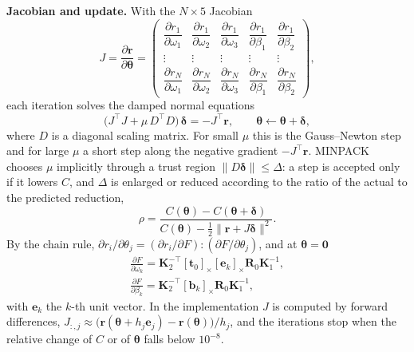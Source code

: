 \documentclass[10pt,a4paper,twocolumn]{article}
\newcommand{\R}{\mathbf{R}}
\newcommand{\tv}{\mathbf{t}}
\newcommand{\K}{\mathbf{K}}
\begin{document}
\textbf{Jacobian and update.} With the $N\times5$ Jacobian
\begin{equation}
  J=\frac{\partial\mathbf{r}}{\partial\boldsymbol\theta}=
  \begin{pmatrix}
    \dfrac{\partial r_1}{\partial\omega_1}&\dfrac{\partial r_1}{\partial\omega_2}&\dfrac{\partial r_1}{\partial\omega_3}&\dfrac{\partial r_1}{\partial\beta_1}&\dfrac{\partial r_1}{\partial\beta_2}\\[2pt]
    \vdots&\vdots&\vdots&\vdots&\vdots\\
    \dfrac{\partial r_N}{\partial\omega_1}&\dfrac{\partial r_N}{\partial\omega_2}&\dfrac{\partial r_N}{\partial\omega_3}&\dfrac{\partial r_N}{\partial\beta_1}&\dfrac{\partial r_N}{\partial\beta_2}
  \end{pmatrix},
\end{equation}
each iteration solves the damped normal equations
\begin{equation}
  \big(J^\top J+\mu\,D^\top D\big)\,\boldsymbol\delta=-J^\top\mathbf{r},\qquad \boldsymbol\theta\leftarrow\boldsymbol\theta+\boldsymbol\delta ,
\end{equation}
where $D$ is a diagonal scaling matrix. For small $\mu$ this is the Gauss--Newton step and for large $\mu$ a short step along the negative gradient $-J^\top\mathbf{r}$. MINPACK chooses $\mu$ implicitly through a trust region $\|D\boldsymbol\delta\|\le\Delta$: a step is accepted only if it lowers $C$, and $\Delta$ is enlarged or reduced according to the ratio of the actual to the predicted reduction,
\begin{equation}
  \rho=\frac{C(\boldsymbol\theta)-C(\boldsymbol\theta+\boldsymbol\delta)}{C(\boldsymbol\theta)-\tfrac12\|\mathbf{r}+J\boldsymbol\delta\|^2}.
\end{equation}
By the chain rule, $\partial r_i/\partial\theta_j=(\partial r_i/\partial F):(\partial F/\partial\theta_j)$, and at $\boldsymbol\theta=\mathbf{0}$
\begin{gather}
  \frac{\partial F}{\partial\omega_k}=\K_2^{-\top}[\tv_0]_\times[\mathbf{e}_k]_\times\R_0\K_1^{-1},\\
  \frac{\partial F}{\partial\beta_k}=\K_2^{-\top}[\mathbf{b}_k]_\times\R_0\K_1^{-1},
\end{gather}
with $\mathbf{e}_k$ the $k$-th unit vector. In the implementation $J$ is computed by forward differences, $J_{:,j}\approx\big(\mathbf{r}(\boldsymbol\theta+h_j\mathbf{e}_j)-\mathbf{r}(\boldsymbol\theta)\big)/h_j$, and the iterations stop when the relative change of $C$ or of $\boldsymbol\theta$ falls below $10^{-8}$.
\end{document}
